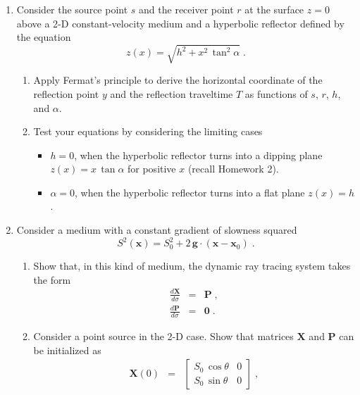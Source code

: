 \begin{enumerate}
\item Consider the source point $s$ and the receiver point $r$ at the
  surface $z=0$ above a 2-D constant-velocity medium and a hyperbolic
  reflector defined by the equation 
  \begin{equation}
    \label{eq:hyper}
    z(x) = \sqrt{h^2 +
      x^2\,\tan^2{\alpha}}\;.
  \end{equation}
  \begin{enumerate}
  \item Apply Fermat's principle to derive the horizontal coordinate of
    the reflection point $y$ and the reflection traveltime $T$ as 
    functions of $s$, $r$, $h$, and $\alpha$.
  \item Test your equations by considering the limiting cases
    \begin{itemize}
    \item $h=0$, 
      when the hyperbolic reflector turns into a dipping 
      plane $z(x)= x\,\tan{\alpha}$ for positive $x$ (recall Homework 2).
    \item $\alpha=0$,
      when the
      hyperbolic reflector turns into a flat plane $z(x)=h$.
    \end{itemize}
  \end{enumerate}
\item Consider a medium with a constant gradient of slowness squared
  \begin{equation}
    S^2(\mathbf{x}) = S_0^2 + 2\,\mathbf{g} \cdot (\mathbf{x}-\mathbf{x}_0)\;.
  \end{equation}
  \begin{enumerate}
  \item Show that, in this kind of medium, the dynamic ray tracing system
    takes the form
  \begin{eqnarray}
    \label{eq:dxds}
    {\frac{d \mathbf{X}}{d \sigma}} & = & \mathbf{P}\;, \\
    {\frac{d \mathbf{P}}{d \sigma}} & = & \mathbf{0}\;.
    \label{eq:dpds}
  \end{eqnarray}
\item Consider a point source in the 2-D case. Show that matrices
  $\mathbf{X}$ and $\mathbf{P}$ can be initialized as
  \begin{eqnarray}
    \label{eq:x0}
    \mathbf{X}(0) & = & \left[\begin{array}{cc} 
        S_0\,\cos{\theta} & 0 \\
        S_0\,\sin{\theta} & 0 \end{array}\right]\;, \\

\end{eqnarray}
\end{enumerate}
\end{enumerate}
